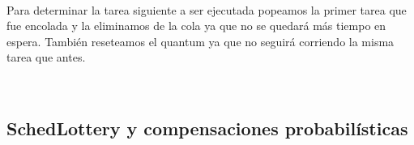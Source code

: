 ~

Para determinar la tarea siguiente a ser ejecutada popeamos la primer tarea que fue encolada y la eliminamos de la cola ya que no se quedará más tiempo en espera. También reseteamos el quantum ya que no seguirá corriendo la misma tarea que antes.

~

\subsection{SchedLottery y compensaciones probabilísticas}



%

